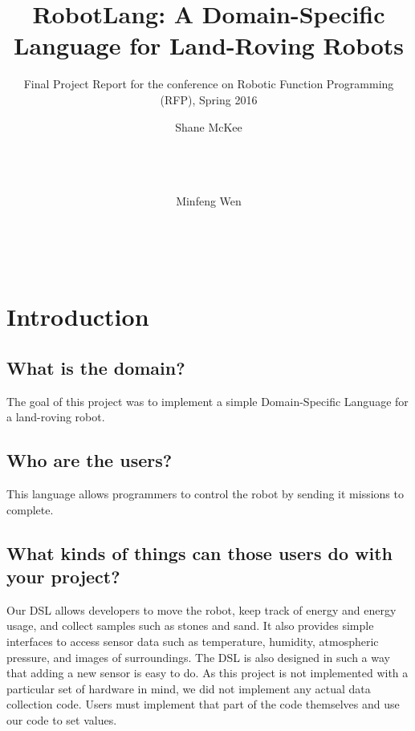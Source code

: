 \documentclass{sig-alternate-05-2015}
\begin{document}





\title{RobotLang: A Domain-Specific Language for Land-Roving Robots}
\subtitle{Final Project Report for the conference on Robotic Function Programming (RFP), Spring 2016}


\author{
\alignauthor
	Shane McKee\\
       	\\
       	\\
       	\\
\and
\alignauthor
Minfeng Wen\\
       \\
       \\
       \\
}

\maketitle

\section{Introduction} 
\subsection{What is the domain?}
The goal of this project was to implement a simple Domain-Specific Language for a land-roving robot. 
\subsection{Who are the users?}
This language allows programmers to control the robot by sending it missions to complete. 
\subsection{What kinds of things can those users do with your project?}
Our DSL allows developers to move the robot, keep track of energy and energy usage, and collect samples such as stones and sand. It also provides simple interfaces to access sensor data such as temperature, humidity, atmospheric pressure, and images of surroundings. The DSL is also designed in such a way that adding a new sensor is easy to do. As this project is not implemented with a particular set of hardware in mind, we did not implement any actual data collection code. Users must implement that part of the code themselves and use our code to set values.
\end{document}
